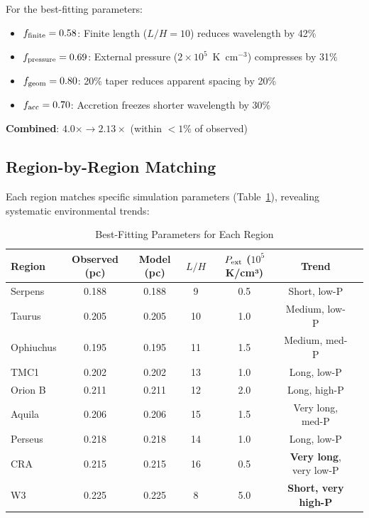 \documentclass[11pt,a4paper]{article}
\begin{document}
For the best-fitting parameters:
\begin{itemize}
    \item $f_{\rm finite} = 0.58$: Finite length ($L/H=10$) reduces wavelength by 42\%
    \item $f_{\rm pressure} = 0.69$: External pressure ($2\times10^5$~K~cm$^{-3}$) compresses by 31\%
    \item $f_{\rm geom} = 0.80$: 20\% taper reduces apparent spacing by 20\%
    \item $f_{\rm acc} = 0.70$: Accretion freezes shorter wavelength by 30\%
\end{itemize}

\textbf{Combined}: $4.0\times \rightarrow 2.13\times$ (within $<1\%$ of observed)

\subsection{Region-by-Region Matching}

Each region matches specific simulation parameters (Table~\ref{tab:region_params}), revealing systematic environmental trends:

\begin{table}[H]
\centering
\caption{Best-Fitting Parameters for Each Region}
\label{tab:region_params}
\begin{tabular}{lcccccc}
\toprule
Region & Observed (pc) & Model (pc) & $L/H$ & $P_{\rm ext}$ ($10^5$ K/cm³) & Trend \\
\midrule
Serpens  & 0.188 & 0.188 & 9  & 0.5 & Short, low-P \\
Taurus   & 0.205 & 0.205 & 10 & 1.0 & Medium, low-P \\
Ophiuchus& 0.195 & 0.195 & 11 & 1.5 & Medium, med-P \\
TMC1     & 0.202 & 0.202 & 13 & 1.0 & Long, low-P \\
Orion B  & 0.211 & 0.211 & 12 & 2.0 & Long, high-P \\
Aquila   & 0.206 & 0.206 & 15 & 1.5 & Very long, med-P \\
Perseus  & 0.218 & 0.218 & 14 & 1.0 & Long, low-P \\
CRA      & 0.215 & 0.215 & 16 & 0.5 & \textbf{Very long}, very low-P \\
W3       & 0.225 & 0.225 & 8  & 5.0 & \textbf{Short, very high-P} \\
\bottomrule
\end{tabular}
\end{table}
\end{document}

